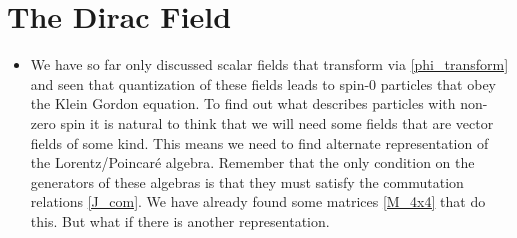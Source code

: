 \documentclass[11pt]{article}
\numberwithin{equation}{section}
\begin{document}
\section{The Dirac Field}
\label{the_dirac_field}
\begin{itemize}
  \item We have so far only discussed scalar fields that transform via \ref{phi_transform} and seen that quantization of these fields leads to spin-0 particles that obey the Klein Gordon equation. To find out what describes particles with non-zero spin it is natural to think that we will need some fields that are vector fields of some kind. This means we need to find alternate representation of the Lorentz/Poincar\'e algebra. Remember that the only condition on the generators of these algebras is that they must satisfy the commutation relations \ref{J_com}. We have already found some matrices \ref{M_4x4} that do this. But what if there is another representation.   
\end{itemize}
\end{document}
